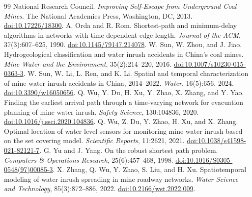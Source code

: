 \documentclass[11pt,a4paper]{article}
\begin{document}
\begin{thebibliography}{99}
 National Research Council. \emph{Improving Self-Escape from Underground Coal Mines}. The National Academies Press, Washington, DC, 2013. \href{https://doi.org/10.17226/18300}{doi:10.17226/18300}.
 A. Orda and R. Rom. Shortest-path and minimum-delay algorithms in networks with time-dependent edge-length. \emph{Journal of the ACM}, 37(3):607--625, 1990. \href{https://doi.org/10.1145/79147.214078}{doi:10.1145/79147.214078}.
 W. Sun, W. Zhou, and J. Jiao. Hydrogeological classification and water inrush accidents in China's coal mines. \emph{Mine Water and the Environment}, 35(2):214--220, 2016. \href{https://doi.org/10.1007/s10230-015-0363-3}{doi:10.1007/s10230-015-0363-3}.
 W. Sun, W. Li, L. Ren, and K. Li. Spatial and temporal characterization of mine water inrush accidents in China, 2014--2022. \emph{Water}, 16(5):656, 2024. \href{https://doi.org/10.3390/w16050656}{doi:10.3390/w16050656}.
 Q. Wu, Y. Du, H. Xu, Y. Zhao, X. Zhang, and Y. Yao. Finding the earliest arrival path through a time-varying network for evacuation planning of mine water inrush. \emph{Safety Science}, 130:104836, 2020. \href{https://doi.org/10.1016/j.ssci.2020.104836}{doi:10.1016/j.ssci.2020.104836}.
 Q. Wu, Z. Du, Y. Zhao, H. Xu, and X. Zhang. Optimal location of water level sensors for monitoring mine water inrush based on the set covering model. \emph{Scientific Reports}, 11:2621, 2021. \href{https://doi.org/10.1038/s41598-021-82121-7}{doi:10.1038/s41598-021-82121-7}.
 G. Yu and J. Yang. On the robust shortest path problem. \emph{Computers \& Operations Research}, 25(6):457--468, 1998. \href{https://doi.org/10.1016/S0305-0548(97)00085-3}{doi:10.1016/S0305-0548(97)00085-3}.
 X. Zhang, Q. Wu, Y. Zhao, S. Liu, and H. Xu. Spatiotemporal modeling of water inrush spreading in mine roadway networks. \emph{Water Science and Technology}, 85(3):872--886, 2022. \href{https://doi.org/10.2166/wst.2022.009}{doi:10.2166/wst.2022.009}.
\end{thebibliography}
\clearpage
\appendix

\end{document}
